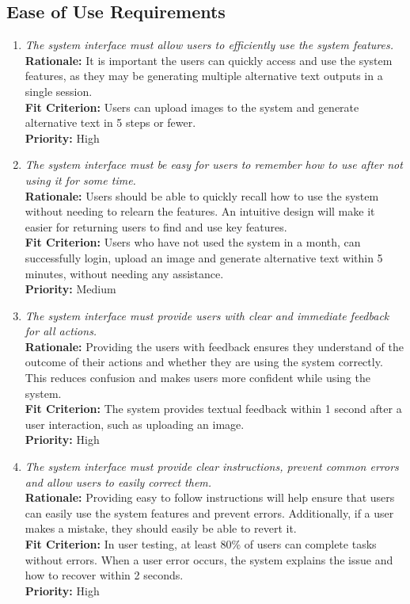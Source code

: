 \documentclass[12pt]{article}
\begin{document}
\subsection{Ease of Use Requirements}
\begin{enumerate}[label=UHR-EUR \arabic*., wide=0pt, leftmargin=*]
\item \emph{The system interface must allow users to efficiently use the system features.}\\[2mm] 
    {\bf Rationale:} It is important the users can quickly access and use the system features, as they may be generating multiple alternative text outputs in a single session. \\
    {\bf Fit Criterion:} Users can upload images to the system and generate alternative text in 5 steps or fewer. \\
    {\bf Priority:} High
\item \emph{The system interface must be easy for users to remember how to use after not using it for some time.}\\[2mm] 
    {\bf Rationale:} Users should be able to quickly recall how to use the system without needing to relearn the features. An intuitive design will make it easier for returning users to find and use key features.  \\
    {\bf Fit Criterion:} Users who have not used the system in a month, can successfully login, upload an image and generate alternative text within 5 minutes, without needing any assistance. \\
    {\bf Priority:} Medium
\item \emph{The system interface must provide users with clear and immediate feedback for all actions.}\\[2mm] 
    {\bf Rationale:} Providing the users with feedback ensures they understand of the outcome of their actions and whether they are using the system correctly. This reduces confusion and makes users more confident while using the system. \\
    {\bf Fit Criterion:} The system provides textual feedback within 1 second after a user interaction, such as uploading an image.  \\
    {\bf Priority:} High 
\item \emph{The system interface must provide clear instructions, prevent common errors and allow users to easily correct them.}\\[2mm] 
    {\bf Rationale:} Providing easy to follow instructions will help ensure that users can easily use the system features and prevent errors. Additionally, if a user makes a mistake, they should easily be able to revert it.  \\
    {\bf Fit Criterion:} In user testing, at least 80\% of users can complete tasks without errors. When a user error occurs, the system explains the issue and how to recover within 2 seconds.\\
    {\bf Priority:} High 
\end{enumerate}
\end{document}
